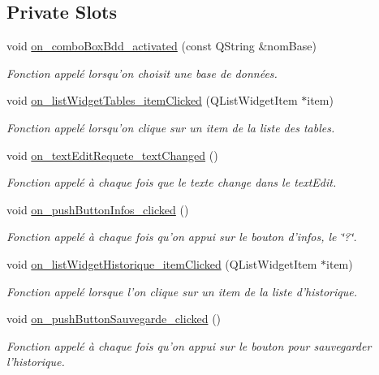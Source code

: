\subsection*{Private Slots}
\begin{DoxyCompactItemize}
\item 
void \hyperlink{class_main_window_ac78407ed9c898fcb27bc2db4a67a6e0a}{on\-\_\-combo\-Box\-Bdd\-\_\-activated} (const Q\-String \&nom\-Base)
\begin{DoxyCompactList}\small\item\em Fonction appelé lorsqu'on choisit une base de données. \end{DoxyCompactList}\item 
void \hyperlink{class_main_window_ad68380800ff39679a8e597d07cb27ee4}{on\-\_\-list\-Widget\-Tables\-\_\-item\-Clicked} (Q\-List\-Widget\-Item $\ast$item)
\begin{DoxyCompactList}\small\item\em Fonction appelé lorsqu'on clique sur un item de la liste des tables. \end{DoxyCompactList}\item 
void \hyperlink{class_main_window_a122b5a2422b6327ae7138e420ba268e7}{on\-\_\-text\-Edit\-Requete\-\_\-text\-Changed} ()
\begin{DoxyCompactList}\small\item\em Fonction appelé à chaque fois que le texte change dans le text\-Edit. \end{DoxyCompactList}\item 
void \hyperlink{class_main_window_af1c558adb235fcf891702302b977f98d}{on\-\_\-push\-Button\-Infos\-\_\-clicked} ()
\begin{DoxyCompactList}\small\item\em Fonction appelé à chaque fois qu'on appui sur le bouton d'infos, le \char`\"{}?\char`\"{}. \end{DoxyCompactList}\item 
void \hyperlink{class_main_window_ae0c936a373039e3683d5cf838511842d}{on\-\_\-list\-Widget\-Historique\-\_\-item\-Clicked} (Q\-List\-Widget\-Item $\ast$item)
\begin{DoxyCompactList}\small\item\em Fonction appelé lorsque l'on clique sur un item de la liste d'historique. \end{DoxyCompactList}\item 
void \hyperlink{class_main_window_a9ccbc3dd9764c0ada1891edc25eaac77}{on\-\_\-push\-Button\-Sauvegarde\-\_\-clicked} ()
\begin{DoxyCompactList}\small\item\em Fonction appelé à chaque fois qu'on appui sur le bouton pour sauvegarder l'historique. \end{DoxyCompactList}\item 

\end{DoxyCompactItemize}
